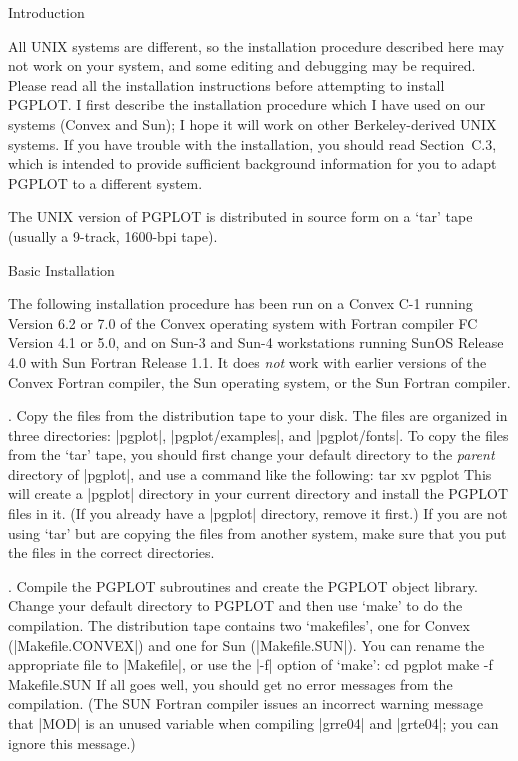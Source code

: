 

\beginsection Introduction

All UNIX systems are different, so the installation procedure described 
here may not work on your system, and some editing and debugging may be 
required.  Please read all the installation instructions before
attempting to install PGPLOT. I first describe the installation
procedure which I have used on our systems (Convex and Sun); I hope it
will work on other Berkeley-derived UNIX systems. If you have trouble
with the installation, you should read Section~C.3, which is
intended to provide sufficient background information for you to adapt
PGPLOT to a different system. 

The UNIX version of PGPLOT is distributed in source form on a `tar' tape
(usually a 9-track, 1600-bpi tape).

\beginsection Basic Installation

The following installation procedure has been run on a Convex C-1
running Version 6.2 or 7.0 of the Convex operating system with Fortran
compiler FC Version 4.1 or 5.0, and on Sun-3 and Sun-4 workstations
running SunOS Release 4.0 with Sun Fortran Release 1.1. It does {\it
not\/} work with earlier versions of the Convex Fortran compiler, the
Sun operating system, or the Sun Fortran compiler. 

\bigskip{}. Copy the files from the distribution tape to your disk. The files
are organized in three directories: |pgplot|, |pgplot/examples|, and 
|pgplot/fonts|. To copy the files from the `tar' tape, you should first
change your default directory to the {\it parent\/} directory of 
|pgplot|, and use a command like the following:
\begintt
tar xv pgplot
\endtt
This will create a |pgplot| directory in your current directory and 
install the PGPLOT files in it. (If you already have a |pgplot| 
directory, remove it first.) If you are not using `tar' but are copying 
the files from another system, make sure that you put the files in the
correct directories.

\bigskip{}. Compile the PGPLOT subroutines and create the PGPLOT object library.
Change your default directory to PGPLOT and then use `make' to do the 
compilation. The distribution tape contains two `makefiles', one for
Convex (|Makefile.CONVEX|) and one for Sun (|Makefile.SUN|). You can
rename the appropriate file to |Makefile|, or use the |-f| option of 
`make':
\begintt
cd pgplot
make -f Makefile.SUN
\endtt
If all goes well, you should get no error messages from the compilation.
(The SUN Fortran compiler issues an incorrect warning message that |MOD|
is an unused variable when compiling |grre04| and |grte04|; you can 
ignore this message.)

